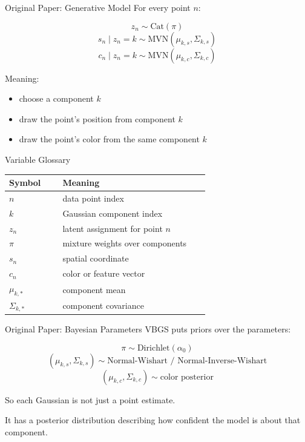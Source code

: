 \documentclass[aspectratio=169]{beamer}
\begin{document}
\begin{frame}{Original Paper: Generative Model}
  For every point \(n\):

  \[
    z_n \sim \mathrm{Cat}(\pi)
  \]
  \[
    s_n \mid z_n = k \sim \mathrm{MVN}(\mu_{k,s}, \Sigma_{k,s})
  \]
  \[
    c_n \mid z_n = k \sim \mathrm{MVN}(\mu_{k,c}, \Sigma_{k,c})
  \]

  \vspace{0.8em}
  Meaning:
  \begin{itemize}
    \item choose a component \(k\)
    \item draw the point's position from component \(k\)
    \item draw the point's color from the same component \(k\)
  \end{itemize}
\end{frame}

\begin{frame}{Variable Glossary}
  \small
  \begin{tabular}{p{0.24\linewidth} p{0.66\linewidth}}
    \toprule
    Symbol & Meaning \\
    \midrule
    \(n\) & data point index \\
    \(k\) & Gaussian component index \\
    \(z_n\) & latent assignment for point \(n\) \\
    \(\pi\) & mixture weights over components \\
    \(s_n\) & spatial coordinate \\
    \(c_n\) & color or feature vector \\
    \(\mu_{k,*}\) & component mean \\
    \(\Sigma_{k,*}\) & component covariance \\
    \bottomrule
  \end{tabular}
\end{frame}

\begin{frame}{Original Paper: Bayesian Parameters}
  VBGS puts priors over the parameters:

  \[
    \pi \sim \mathrm{Dirichlet}(\alpha_0)
  \]
  \[
    (\mu_{k,s}, \Sigma_{k,s}) \sim \text{Normal-Wishart / Normal-Inverse-Wishart}
  \]
  \[
    (\mu_{k,c}, \Sigma_{k,c}) \sim \text{color posterior}
  \]

  \vspace{0.8em}
  So each Gaussian is not just a point estimate.

  \vspace{0.8em}
  It has a posterior distribution describing how confident the model is about
  that component.
\end{frame}
\end{document}
